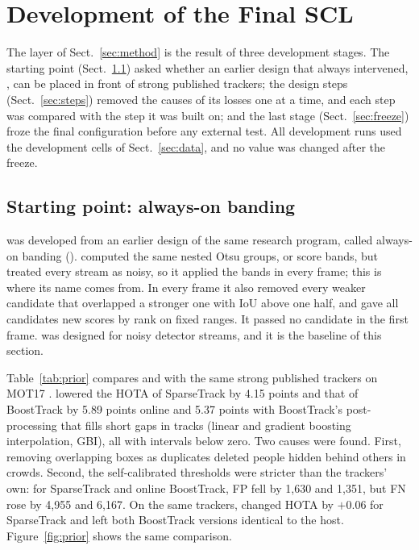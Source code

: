 \section{Development of the Final SCL}\label{sec:development}

The layer of Sect.~\ref{sec:method} is the result of three development stages. The starting point
(Sect.~\ref{sec:prior}) asked whether an earlier design that always intervened, \aob{}, can be
placed in front of strong published trackers; the design steps (Sect.~\ref{sec:steps}) removed the
causes of its losses one at a time, and each step was compared with the step it was built on; and
the last stage (Sect.~\ref{sec:freeze}) froze the final configuration before any external test.
All development runs used the development cells of Sect.~\ref{sec:data}, and no value was changed
after the freeze.

\subsection{Starting point: always-on banding}\label{sec:prior}
\scl{} was developed from an earlier design of the same research program,
called always-on banding (\aob{}). \aob{} computed the same nested Otsu
groups, or score bands, but treated every stream as noisy, so it applied the
bands in every frame; this is where its name comes from. In every frame it
also removed every weaker candidate that overlapped a stronger one with
IoU above one half, and gave all candidates new scores by rank on fixed
ranges. It passed no candidate in the first frame. \aob{} was designed for
noisy detector streams, and it is the baseline of this section.

Table~\ref{tab:prior} compares \aob{} and \scl{} with the same strong
published trackers on MOT17 \cite{milan2016mot16}. \aob{} lowered the HOTA of
SparseTrack by 4.15 points and that of BoostTrack by 5.89 points online and
5.37 points with BoostTrack's post-processing that fills short gaps in
tracks (linear and gradient boosting interpolation, GBI), all with
intervals below zero. Two causes
were found. First, removing overlapping boxes as duplicates deleted people
hidden behind others in crowds. Second, the self-calibrated thresholds were
stricter than the trackers' own: for SparseTrack and online BoostTrack, FP
fell by 1,630 and 1,351, but FN rose by 4,955 and 6,167. On the same trackers, \scl{} changed HOTA by $+0.06$ for SparseTrack
and left both BoostTrack versions identical to the host.
Figure~\ref{fig:prior} shows the same comparison.

